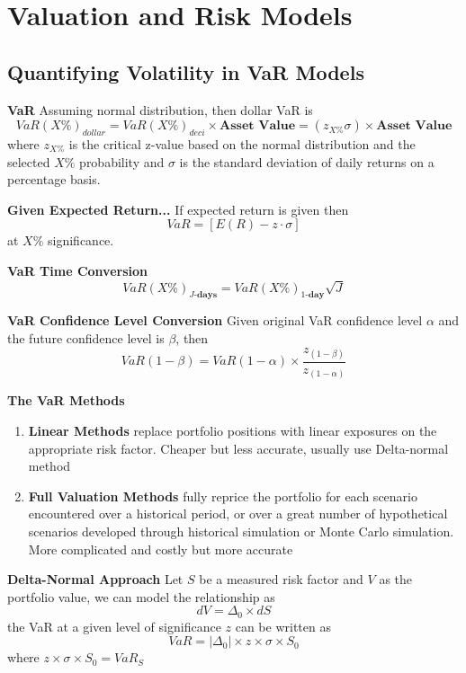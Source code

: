 \documentclass[11pt,fleqn]{book} %
\numberwithin{equation}{section} %
\numberwithin{figure}{section} %
\numberwithin{table}{section} %
\begin{document}
 \part{Valuation and Risk Models}

\chapter{Quantifying Volatility in VaR Models}
\begin{definition}\textbf{VaR}
Assuming normal distribution, then dollar VaR is
    $$
    VaR(X\%)_{dollar}=VaR(X\%)_{deci}\times\textbf{Asset Value}=(z_{X\%}\sigma)\times\textbf{Asset Value}
    $$
    where $z_{X\%}$ is the critical z-value based on the normal distribution and the selected $X\%$ probability and $\sigma$ is the standard deviation of daily returns on a percentage basis.
\end{definition}
\begin{remark}\textbf{Given Expected Return...}
If expected return is given then
$$
VaR=[E(R)-z\cdot\sigma]
$$
at $X\%$ significance.
\end{remark}
\begin{theorem}\textbf{VaR Time Conversion}
$$
VaR(X\%)_{J\textbf{-days}}=VaR(X\%)_{1\textbf{-day}}\sqrt{J}
$$
\end{theorem}
\begin{theorem}\textbf{VaR Confidence Level Conversion}
Given original VaR confidence level $\alpha$ and the future confidence level is $\beta$, then
$$
VaR(1-\beta)=VaR(1-\alpha)\times\frac{z_{(1-\beta)}}{z_{(1-\alpha)}}
$$
\end{theorem}
\begin{definition}\textbf{The VaR Methods}
\begin{enumerate}
    \item \textbf{Linear Methods} replace portfolio positions with linear exposures on the appropriate risk factor. Cheaper but less accurate, usually use Delta-normal method
    \item \textbf{Full Valuation Methods} fully reprice the portfolio for each scenario encountered over a historical period, or over a great number of hypothetical scenarios developed through historical simulation or Monte Carlo simulation. More complicated and costly but more accurate
\end{enumerate}
\end{definition}
\begin{definition}\textbf{Delta-Normal Approach}
Let $S$ be a measured risk factor and $V$ as the portfolio value, we can model the relationship as
$$
dV=\Delta_0\times dS
$$
the VaR at a given level of significance $z$ can be written as
$$
VaR=|\Delta_0|\times z\times\sigma\times S_0
$$
where $z\times\sigma\times S_0=VaR_S$
\end{definition}
\end{document}
